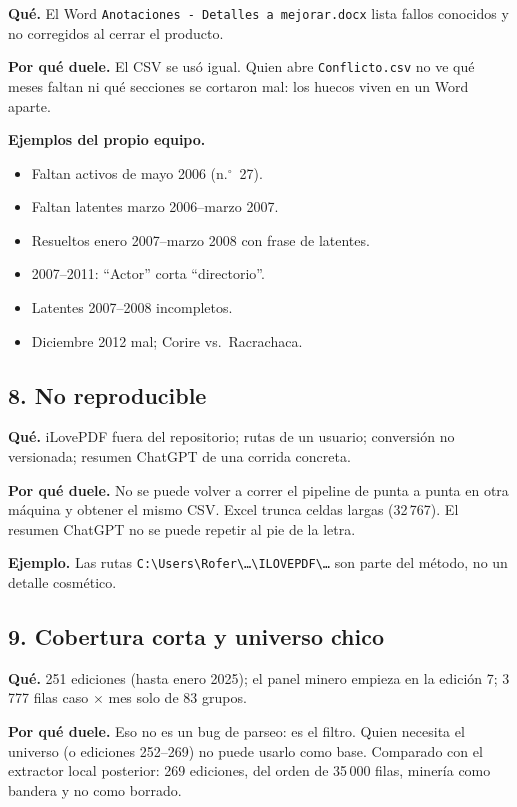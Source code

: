 \documentclass[11pt,a4paper]{article}
\begin{document}
\textbf{Qué.} El Word \texttt{Anotaciones - Detalles a mejorar.docx} lista fallos conocidos y no corregidos al cerrar el producto.

\textbf{Por qué duele.} El CSV se usó igual. Quien abre \texttt{Conflicto.csv} no ve qué meses faltan ni qué secciones se cortaron mal: los huecos viven en un Word aparte.

\textbf{Ejemplos del propio equipo.}
\begin{itemize}
  \item Faltan activos de mayo 2006 (n.$^\circ$~27).
  \item Faltan latentes marzo 2006--marzo 2007.
  \item Resueltos enero 2007--marzo 2008 con frase de latentes.
  \item 2007--2011: ``Actor'' corta ``directorio''.
  \item Latentes 2007--2008 incompletos.
  \item Diciembre 2012 mal; Corire vs.\ Racrachaca.
\end{itemize}

\subsection{8. No reproducible}

\textbf{Qué.} iLovePDF fuera del repositorio; rutas de un usuario; conversión no versionada; resumen ChatGPT de una corrida concreta.

\textbf{Por qué duele.} No se puede volver a correr el pipeline de punta a punta en otra máquina y obtener el mismo CSV. Excel trunca celdas largas (32\,767). El resumen ChatGPT no se puede repetir al pie de la letra.

\textbf{Ejemplo.} Las rutas \texttt{C:\textbackslash Users\textbackslash Rofer\textbackslash \ldots\textbackslash ILOVEPDF\textbackslash \ldots} son parte del método, no un detalle cosmético.

\subsection{9. Cobertura corta y universo chico}

\textbf{Qué.} 251 ediciones (hasta enero 2025); el panel minero empieza en la edición 7; 3\,777 filas caso $\times$ mes solo de 83 grupos.

\textbf{Por qué duele.} Eso no es un bug de parseo: es el filtro. Quien necesita el universo (o ediciones 252--269) no puede usarlo como base. Comparado con el extractor local posterior: 269 ediciones, del orden de 35\,000 filas, minería como bandera y no como borrado.
\end{document}

